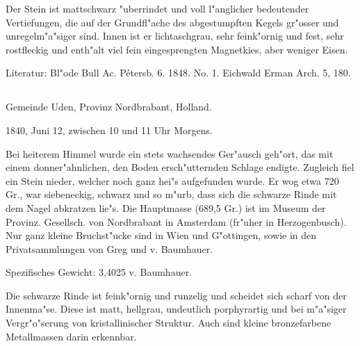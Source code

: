 \documentclass[a4paper, 11pt, oneside]{article}
\begin{document}
Der Stein ist mattschwarz "uberrindet und voll l"anglicher bedeutender Vertiefungen, die auf der Grundfl"ache des abgestumpften Kegels gr"osser und unregelm"a"siger sind. Innen ist er lichtaschgrau, sehr feink"ornig und fest, sehr rostfleckig und enth"alt viel fein eingesprengten Magnetkies, aber weniger Eisen.

\normalsize
Literatur: Bl"ode Bull Ac. Pétersb. 6. 1848. No. 1. Eichwald Erman Arch. 5, 180.

\subsection{}
\LARGE
\paragraph{}
Gemeinde Uden, Provinz Nordbrabant, Holland.

1840, Juni 12, zwischen 10 und 11 Uhr Morgens.

Bei heiterem Himmel wurde ein stets wachsendes Ger"ausch geh"ort, das mit einem donner"ahnlichen, den Boden ersch"utternden Schlage endigte. Zugleich fiel ein Stein nieder, welcher noch ganz hei"s aufgefunden wurde. Er wog etwa 720 Gr., war siebeneckig, schwarz und so m"urb, dass sich die schwarze Rinde mit dem Nagel abkratzen lie"s. Die Hauptmasse (689,5 Gr.) ist im Museum der Provinz. Gesellsch. von Nordbrabant in Amsterdam (fr"uher in Herzogenbusch). Nur ganz kleine Bruchst"ucke sind in Wien und G"ottingen, sowie in den Privatsammlungen von Greg und v. Baumhauer.

Spezifisches Gewicht: 3,4025 v. Baumhauer.

Die schwarze Rinde ist feink"ornig und runzelig und scheidet sich scharf von der Innenma"se. Diese ist matt, hellgrau, undeutlich porphyrartig und bei m"a"siger Vergr"o"serung von kristallinischer Struktur. Auch sind kleine bronzefarbene Metallmassen darin erkennbar.
\end{document}
